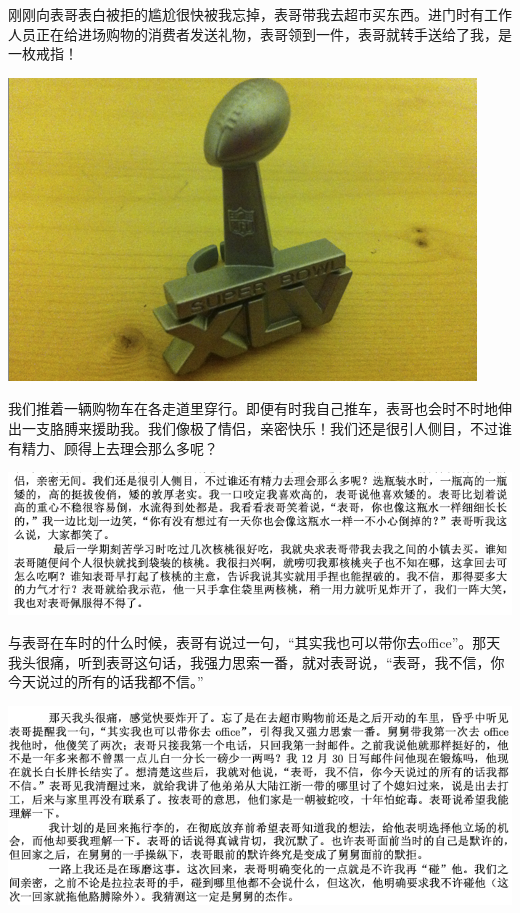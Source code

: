 \documentclass[9pt, b5paper]{article}
\begin{document}
刚刚向表哥表白被拒的尴尬很快被我忘掉，表哥带我去超市买东西。进门时有工作人员正在给进场购物的消费者发送礼物，表哥领到一件，表哥就转手送给了我，是一枚戒指！

\begin{center}
\includegraphics[width=.9\linewidth]{./pic/readme_20210414_102944.png}
\end{center}

我们推着一辆购物车在各走道里穿行。即便有时我自己推车，表哥也会时不时地伸出一支胳膊来援助我。我们像极了情侣，亲密快乐！我们还是很引人侧目，不过谁有精力、顾得上去理会那么多呢？

\begin{center}
\includegraphics[width=.9\linewidth]{./pic/p1p50-1.png}
\end{center}  

与表哥在车时的什么时候，表哥有说过一句，“其实我也可以带你去office”。那天我头很痛，听到表哥这句话，我强力思索一番，就对表哥说，“表哥，我不信，你今天说过的所有的话我都不信。”

\begin{center}
\includegraphics[width=.9\linewidth]{./pic/p1p50-2.png}
\end{center}  
\end{document}
